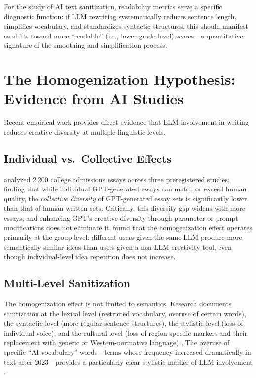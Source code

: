 \documentclass[12pt,a4paper]{article}
\begin{document}
For the study of AI text sanitization, readability metrics serve a specific diagnostic function: if LLM rewriting systematically reduces sentence length, simplifies vocabulary, and standardizes syntactic structures, this should manifest as shifts toward more ``readable'' (i.e., lower grade-level) scores---a quantitative signature of the smoothing and simplification process.

\section{The Homogenization Hypothesis: Evidence from AI Studies}

Recent empirical work provides direct evidence that LLM involvement in writing reduces creative diversity at multiple linguistic levels.

\subsection{Individual vs.\ Collective Effects}

\citet{anderson2024homogenizing} analyzed 2,200 college admissions essays across three preregistered studies, finding that while individual GPT-generated essays can match or exceed human quality, the \emph{collective diversity} of GPT-generated essay sets is significantly lower than that of human-written sets. Critically, this diversity gap widens with more essays, and enhancing GPT's creative diversity through parameter or prompt modifications does not eliminate it. \citet{kreminski2024homogenization} found that the homogenization effect operates primarily at the group level: different users given the same LLM produce more semantically similar ideas than users given a non-LLM creativity tool, even though individual-level idea repetition does not increase.

\subsection{Multi-Level Sanitization}

The homogenization effect is not limited to semantics. Research documents sanitization at the lexical level (restricted vocabulary, overuse of certain words), the syntactic level (more regular sentence structures), the stylistic level (loss of individual voice), and the cultural level (loss of region-specific markers and their replacement with generic or Western-normative language) \citep{homogenization_arxiv2025, can_ai_writing2024}. The overuse of specific ``AI vocabulary'' words---terms whose frequency increased dramatically in text after 2023---provides a particularly clear stylistic marker of LLM involvement \citep{tang2024survey}.
\end{document}
